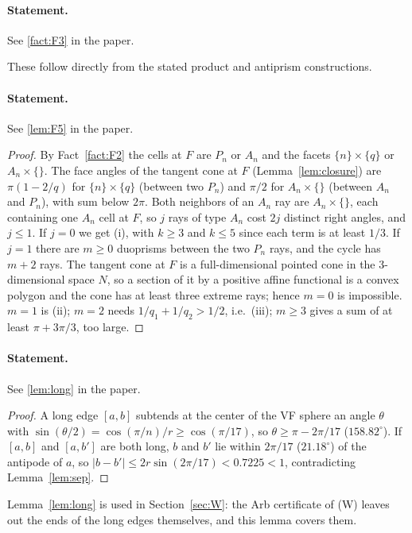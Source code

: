 \documentclass[11pt]{article}
\theoremstyle{definition}
\theoremstyle{remark}
\begin{document}
\paragraph{Statement.} See \ref{fact:F3} in the paper.


These follow directly from the stated product and antiprism constructions.

\paragraph{Statement.} See \ref{lem:F5} in the paper.

\begin{proof}
By Fact~\ref{fact:F2} the cells at $F$ are $P_n$ or $A_n$ and the facets
$\{n\}\times\{q\}$ or $A_n\times\{\}$. The face angles of the tangent cone
at $F$ (Lemma~\ref{lem:closure}) are $\pi(1-2/q)$ for $\{n\}\times\{q\}$
(between two $P_n$) and $\pi/2$ for $A_n\times\{\}$ (between $A_n$ and
$P_n$), with sum below $2\pi$. Both neighbors of an $A_n$ ray are
$A_n\times\{\}$, each containing one $A_n$ cell at $F$, so $j$ rays of type
$A_n$ cost $2j$ distinct right angles, and $j\le1$. If $j=0$ we get (i),
with $k\ge3$ and $k\le5$ since each term is at least $1/3$. If $j=1$ there
are $m\ge0$ duoprisms between the two $P_n$ rays, and the cycle has $m+2$
rays. The tangent cone at $F$ is a full-dimensional pointed cone in the
3-dimensional space $N$, so a section of it by a positive affine functional
is a convex polygon and the cone has at least three extreme rays; hence
$m=0$ is impossible. $m=1$ is (ii); $m=2$ needs $1/q_1+1/q_2>1/2$, i.e.\
(iii); $m\ge3$ gives a sum of at least $\pi+3\pi/3$, too large.
\end{proof}

\paragraph{Statement.} See \ref{lem:long} in the paper.

\begin{proof}
A long edge $[a,b]$ subtends at the center of the VF sphere an angle
$\theta$ with $\sin(\theta/2)=\cos(\pi/n)/r\ge\cos(\pi/17)$, so
$\theta\ge\pi-2\pi/17$ ($158.82^\circ$). If $[a,b]$ and $[a,b']$ are both
long, $b$ and $b'$ lie within $2\pi/17$ ($21.18^\circ$) of the antipode of
$a$, so $|b-b'|\le2r\sin(2\pi/17)<0.7225<1$, contradicting
Lemma~\ref{lem:sep}.
\end{proof}

Lemma~\ref{lem:long} is used in Section~\ref{sec:W}: the Arb
certificate of (W) leaves out the ends of the long edges themselves, and
this lemma covers them.
\end{document}
